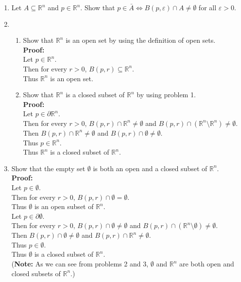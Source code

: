 \documentclass{article}
\begin{document}
\begin{enumerate} \boldmath
    \item Let $A \subseteq \mathbb{R}^n$ and $p \in \mathbb{R}^n$. Show that $p \in \bar A \Leftrightarrow B(p,\varepsilon) \cap A \neq \emptyset$ for all $\varepsilon > 0$.\\ 
   
    \item %

\begin{enumerate}
    \item Show that $\mathbb{R}^n$ is an open set by using the definition of open sets.\\
    
\textbf{Proof:} \\
Let $p \in \mathbb{R}^n$. \\
Then for every $r > 0$, $B(p,r) \subseteq \mathbb{R}^n$. \\
Thus $\mathbb{R}^n$ is an open set.\\

    \item Show that $\mathbb{R}^n$  is a closed subset of $\mathbb{R}^n$  by using problem 1.\\%

\textbf{Proof:} \\
Let $p \in \partial \mathbb{R}^n$. \\
Then for every $r > 0$, $B(p,r) \cap \mathbb{R}^n \neq \emptyset$ and $B(p,r) \cap (\mathbb{R}^n \setminus \mathbb{R}^n) \neq \emptyset$. \\
Then $B(p,r) \cap \mathbb{R}^n \neq \emptyset$ and $B(p,r) \cap \emptyset \neq \emptyset$. \\
Thus $p \in \mathbb{R}^n$. \\
Thus $\mathbb{R}^n$ is a closed subset of $\mathbb{R}^n$.\\
\end{enumerate}


    \item   Show that the empty set $\emptyset$ is both an open and a closed subset of $\mathbb{R}^n$.\\ %
    
\textbf{Proof:} \\ 
Let $p \in \emptyset$. \\
Then for every $r > 0$, $B(p,r) \cap \emptyset = \emptyset$. \\
Thus $\emptyset$ is an open subset of $\mathbb{R}^n$.\\
Let $p \in \partial \emptyset$. \\
Then for every $r > 0$, $B(p,r) \cap \emptyset \neq \emptyset$ and $B(p,r) \cap (\mathbb{R}^n \setminus \emptyset) \neq \emptyset$. \\
Then $B(p,r) \cap \emptyset \neq \emptyset$ and $B(p,r) \cap \mathbb{R}^n \neq \emptyset$. \\
Thus $p \in \emptyset$. \\
Thus $\emptyset$ is a closed subset of $\mathbb{R}^n$.\\
(\textbf{Note:} As we can see from problems 2 and 3, $\emptyset$ and $\mathbb{R}^n$ are both open and closed subsets of $\mathbb{R}^n$.)\\


\end{enumerate}
\end{document}
